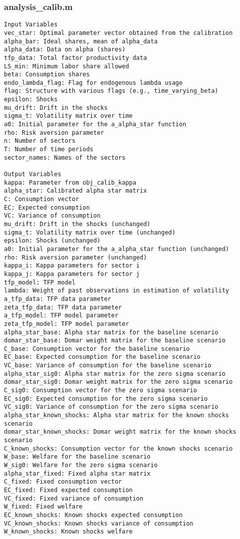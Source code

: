 \documentclass[11pt]{article}
\theoremstyle{definition}
\begin{document}
	\subsubsection{analysis\_calib.m}
	\begin{lstlisting}[style=Matlab]
Input Variables
vec_star: Optimal parameter vector obtained from the calibration  
alpha_bar: Ideal shares, mean of alpha_data  
alpha_data: Data on alpha (shares)  
tfp_data: Total factor productivity data  
LS_min: Minimum labor share allowed  
beta: Consumption shares  
endo_lambda_flag: Flag for endogenous lambda usage  
flag: Structure with various flags (e.g., time_varying_beta)  
epsilon: Shocks  
mu_drift: Drift in the shocks  
sigma_t: Volatility matrix over time  
a0: Initial parameter for the a_alpha_star function  
rho: Risk aversion parameter  
n: Number of sectors  
T: Number of time periods  
sector_names: Names of the sectors  

Output Variables
kappa: Parameter from obj_calib_kappa  
alpha_star: Calibrated alpha star matrix  
C: Consumption vector  
EC: Expected consumption  
VC: Variance of consumption  
mu_drift: Drift in the shocks (unchanged)  
sigma_t: Volatility matrix over time (unchanged)  
epsilon: Shocks (unchanged)  
a0: Initial parameter for the a_alpha_star function (unchanged)  
rho: Risk aversion parameter (unchanged)  
kappa_i: Kappa parameters for sector i  
kappa_j: Kappa parameters for sector j  
tfp_model: TFP model  
lambda: Weight of past observations in estimation of volatility  
a_tfp_data: TFP data parameter  
zeta_tfp_data: TFP data parameter  
a_tfp_model: TFP model parameter  
zeta_tfp_model: TFP model parameter  
alpha_star_base: Alpha star matrix for the baseline scenario  
domar_star_base: Domar weight matrix for the baseline scenario  
C_base: Consumption vector for the baseline scenario  
EC_base: Expected consumption for the baseline scenario  
VC_base: Variance of consumption for the baseline scenario  
alpha_star_sig0: Alpha star matrix for the zero sigma scenario  
domar_star_sig0: Domar weight matrix for the zero sigma scenario  
C_sig0: Consumption vector for the zero sigma scenario  
EC_sig0: Expected consumption for the zero sigma scenario  
VC_sig0: Variance of consumption for the zero sigma scenario  
alpha_star_known_shocks: Alpha star matrix for the known shocks scenario  
domar_star_known_shocks: Domar weight matrix for the known shocks scenario  
C_known_shocks: Consumption vector for the known shocks scenario  
W_base: Welfare for the baseline scenario  
W_sig0: Welfare for the zero sigma scenario  
alpha_star_fixed: Fixed alpha star matrix  
C_fixed: Fixed consumption vector  
EC_fixed: Fixed expected consumption  
VC_fixed: Fixed variance of consumption  
W_fixed: Fixed welfare  
EC_known_shocks: Known shocks expected consumption  
VC_known_shocks: Known shocks variance of consumption  
W_known_shocks: Known shocks welfare  


\end{lstlisting}
\end{document}
